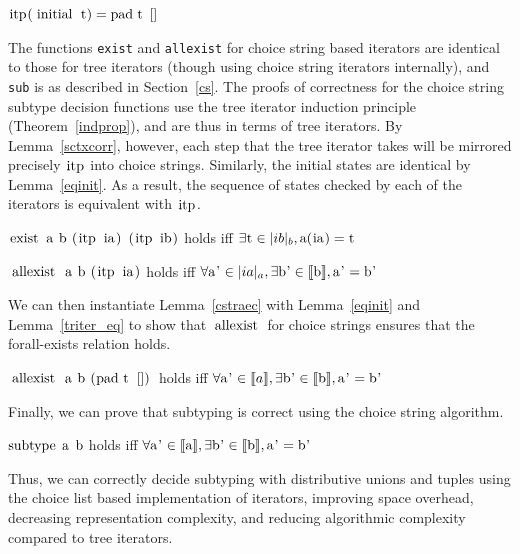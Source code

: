 \documentclass[a4paper,english]{lipics-v2019}
\newcommand{\denotes}[1]{\llbracket #1 \rrbracket}
\renewcommand{\c}[1]{\ensuremath{\text{\lstinline{#1}}}\xspace}
\begin{document}
\begin{lemma}\label{eqinit}
$\c{itp} (\c{initial}\;\c t) = \c{pad}\;\c t \;\c{[]}$
\end{lemma}

The functions \verb|exist| and \verb|allexist| for choice string based
iterators are identical to those for tree iterators (though using choice
string iterators internally), and \verb|sub| is as described in
Section~\ref{cs}. The proofs of correctness for the choice string subtype
decision functions use the tree iterator induction principle
(Theorem~\ref{indprop}), and are thus in terms of tree iterators. By
Lemma~\ref{sctxcorr}, however, each step that the tree iterator takes will be
mirrored precisely \c{itp} into choice strings. Similarly, the initial states
are identical by Lemma~\ref{eqinit}. As a result, the sequence of states
checked by each of the iterators is equivalent with \c{itp}.

\begin{lemma}
\c{exist a b (itp ia) (itp ib)} holds iff $\exists \c t \in \irch{ib}{b}, \c a(\c{ia}) = \c t$
\end{lemma}

\begin{lemma}\label{cstraec}
\c{allexist a b (itp ia)} holds iff $\forall \c{a'} \in \irch{ia}{a}, \exists \c{b'} \in \denotes{\c b}, \c{a'} = \c{b'}$
\end{lemma}

\noindent We can then instantiate Lemma~\ref{cstraec} with Lemma~\ref{eqinit} and
Lemma~\ref{triter_eq} to show that \c{allexist} for choice strings ensures
that the forall-exists relation holds.
 
\begin{theorem}
\c{allexist a b (pad t [])} holds iff $\forall \c{a'} \in \denotes{a}, \exists \c{b'} \in \denotes{\c b}, \c{a'} = \c{b'}$
\end{theorem}

\noindent Finally, we can prove that subtyping is correct using the choice string algorithm.

\begin{theorem}\label{trsub}
\c{subtype} \c a \c b holds iff $\forall \c{a'} \in \denotes{\c a}, \exists \c{b'} \in \denotes{\c b}, \c{a'} = \c{b'}$
\end{theorem}

Thus, we can correctly decide subtyping with distributive unions and tuples
using the choice list based implementation of iterators, improving space overhead,
decreasing representation complexity, and reducing algorithmic complexity compared
to tree iterators. 
\end{document}
